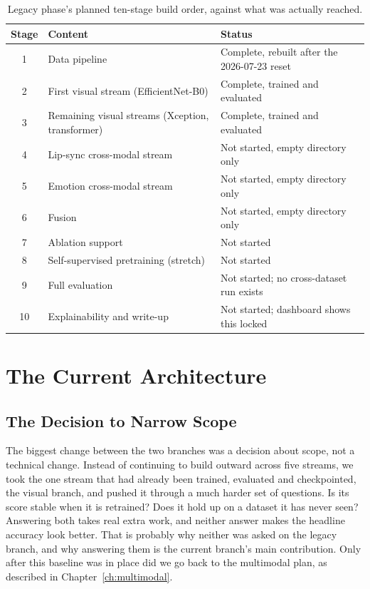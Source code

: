 \begin{table}[ht]
    \centering
    \caption{Legacy phase's planned ten-stage build order, against what was actually reached.}
    \label{tab:stageplan}
    \begin{tabular}{clp{4.6cm}}
        \toprule
        \textbf{Stage} & \textbf{Content} & \textbf{Status} \\
        \midrule
        1  & Data pipeline & Complete, rebuilt after the 2026-07-23 reset \\
        2  & First visual stream (EfficientNet-B0) & Complete, trained and evaluated \\
        3  & Remaining visual streams (Xception, transformer) & Complete, trained and evaluated \\
        4  & Lip-sync cross-modal stream & Not started, empty directory only \\
        5  & Emotion cross-modal stream & Not started, empty directory only \\
        6  & Fusion & Not started, empty directory only \\
        7  & Ablation support & Not started \\
        8  & Self-supervised pretraining (stretch) & Not started \\
        9  & Full evaluation & Not started; no cross-dataset run exists \\
        10 & Explainability and write-up & Not started; dashboard shows this locked \\
        \bottomrule
    \end{tabular}
\end{table}

\chapter{The Current Architecture}
\label{ch:current}

\section{The Decision to Narrow Scope}

The biggest change between the two branches was a decision about scope, not a
technical change. Instead of continuing to build outward across five streams,
we took the one stream that had already been trained, evaluated and
checkpointed, the visual branch, and pushed it through a much harder set of
questions. Is its score stable when it is retrained? Does it hold up on a
dataset it has never seen? Answering both takes real extra work, and neither
answer makes the headline accuracy look better. That is probably why neither
was asked on the legacy branch, and why answering them is the current
branch's main contribution. Only after this baseline was in place did we go
back to the multimodal plan, as described in Chapter~\ref{ch:multimodal}.

